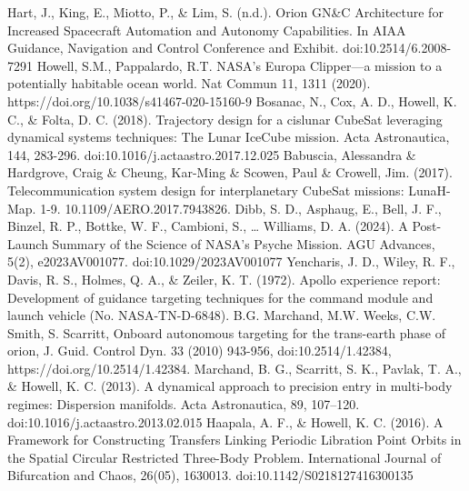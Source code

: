 \documentclass[conference]{IEEEtran}
\begin{document}






\begin{thebibliography}{00}

 Hart, J., King, E., Miotto, P., \& Lim, S. (n.d.). Orion GN\&C Architecture for Increased Spacecraft Automation and Autonomy Capabilities. In AIAA Guidance, Navigation and Control Conference and Exhibit. doi:10.2514/6.2008-7291
 Howell, S.M., Pappalardo, R.T. NASA's Europa Clipper—a mission to a potentially habitable ocean world. Nat Commun 11, 1311 (2020). https://doi.org/10.1038/s41467-020-15160-9
 Bosanac, N., Cox, A. D., Howell, K. C., \& Folta, D. C. (2018). Trajectory design for a cislunar CubeSat leveraging dynamical systems techniques: The Lunar IceCube mission. Acta Astronautica, 144, 283-296. doi:10.1016/j.actaastro.2017.12.025
 Babuscia, Alessandra \& Hardgrove, Craig \& Cheung, Kar-Ming \& Scowen, Paul \& Crowell, Jim. (2017). Telecommunication system design for interplanetary CubeSat missions: LunaH-Map. 1-9. 10.1109/AERO.2017.7943826.
 Dibb, S. D., Asphaug, E., Bell, J. F., Binzel, R. P., Bottke, W. F., Cambioni, S., … Williams, D. A. (2024). A Post-Launch Summary of the Science of NASA's Psyche Mission. AGU Advances, 5(2), e2023AV001077. doi:10.1029/2023AV001077
 Yencharis, J. D., Wiley, R. F., Davis, R. S., Holmes, Q. A., \& Zeiler, K. T. (1972). Apollo experience report: Development of guidance targeting techniques for the command module and launch vehicle (No. NASA-TN-D-6848).
 B.G. Marchand, M.W. Weeks, C.W. Smith, S. Scarritt, Onboard autonomous targeting for the trans-earth phase of orion, J. Guid. Control Dyn. 33 (2010) 943-956, doi:10.2514/1.42384, https://doi.org/10.2514/1.42384.
 Marchand, B. G., Scarritt, S. K., Pavlak, T. A., \& Howell, K. C. (2013). A dynamical approach to precision entry in multi-body regimes: Dispersion manifolds. Acta Astronautica, 89, 107–120. doi:10.1016/j.actaastro.2013.02.015
 Haapala, A. F., \& Howell, K. C. (2016). A Framework for Constructing Transfers Linking Periodic Libration Point Orbits in the Spatial Circular Restricted Three-Body Problem. International Journal of Bifurcation and Chaos, 26(05), 1630013. doi:10.1142/S0218127416300135

\end{thebibliography}
\end{document}

